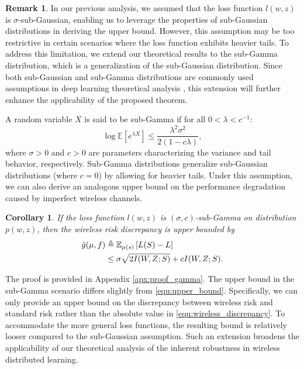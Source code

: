 \documentclass[lettersize,journal]{IEEEtran}
\newcommand{\E}{\mathbb{E}}
\theoremstyle{definition}
\newtheorem{remark}{Remark}
\theoremstyle{plain}
\newtheorem{corollary}{Corollary}
\begin{document}
\begin{remark}
    In our previous analysis, we assumed that the loss function $l(w,z)$ is $\sigma$-sub-Gaussian, enabling us to leverage the properties of sub-Gaussian distributions in deriving the upper bound. However, this assumption may be too restrictive in certain scenarios where the loss function exhibits heavier tails. To address this limitation, we extend our theoretical results to the sub-Gamma distribution, which is a generalization of the sub-Gaussian distribution. Since both sub-Gaussian and sub-Gamma distributions are commonly used assumptions in deep learning theoretical analysis \cite{sub-gamma}, this extension will further enhance the applicability of the proposed theorem.

    A random variable $X$ is said to be sub-Gamma if for all $0<\lambda < c^{-1}$:
    \begin{equation}
        \log \E\left[e^{\lambda X}\right] \leq \frac{\lambda^2 \sigma^2}{2(1-c\lambda)},
    \end{equation}
    where $\sigma>0$ and $c>0$ are parameters characterizing the variance and tail behavior, respectively. Sub-Gamma distributions generalize sub-Gaussian distributions (where $c=0$) by allowing for heavier tails. Under this assumption, we can also derive an analogous upper bound on the performance degradation caused by imperfect wireless channels. 
    \begin{corollary}
        \label{thm:upper_bound_gamma}
        If the loss function $l(w,z)$ is $(\sigma,c)$-sub-Gamma on distribution $p(w,z)$, then the wireless risk discrepancy is upper bounded by
        \begin{equation}
            \begin{split}
                \Tilde{g}(\mu,f) & \triangleq \E_{\mu(s)}\left[ L(S) - L\right] \\
                & \leq \sigma \sqrt{2I(W,Z;S)} + cI(W,Z;S).
            \end{split}
        \end{equation}
    \end{corollary}
    The proof is provided in Appendix \ref{apx:proof_gamma}. The upper bound in the sub-Gamma scenario differs slightly from \cref{equ:upper_bound}. Specifically, we can only provide an upper bound on the discrepancy between wireless risk and standard risk rather than the absolute value in \cref{equ:wireless_discrepancy}. To accommodate the more general loss functions, the resulting bound is relatively looser compared to the sub-Gaussian assumption. Such an extension broadens the applicability of our theoretical analysis of the inherent robustness in wireless distributed learning.
\end{remark}
\end{document}
